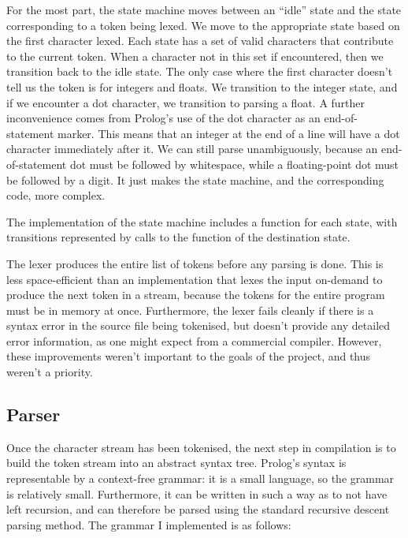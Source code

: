 \documentclass[12pt]{article}
\begin{document}
For the most part, the state machine moves between an ``idle'' state and the state corresponding to a token being lexed. 
We move to the appropriate state based on the first character lexed. 
Each state has a set of valid characters that contribute to the current token. 
When a character not in this set if encountered, then we transition back to the idle state.
The only case where the first character doesn't tell us the token is for integers and floats. 
We transition to the integer state, and if we encounter a dot character, we transition to parsing a float.
A further inconvenience comes from Prolog's use of the dot character as an end-of-statement marker. 
This means that an integer at the end of a line will have a dot character immediately after it. 
We can still parse unambiguously, because an end-of-statement dot must be followed by whitespace, while a floating-point dot must be followed by a digit. 
It just makes the state machine, and the corresponding code, more complex.

The implementation of the state machine includes a function for each state, with transitions represented by calls to the function of the destination state.

The lexer produces the entire list of tokens before any parsing is done. 
This is less space-efficient than an implementation that lexes the input on-demand to produce the next token in a stream, because the tokens for the entire program must be in memory at once. 
Furthermore, the lexer fails cleanly if there is a syntax error in the source file being tokenised, but doesn't provide any detailed error information, as one might expect from a commercial compiler. 
However, these improvements weren't important to the goals of the project, and thus weren't a priority.

\subsection{Parser}

Once the character stream has been tokenised, the next step in compilation is to build the token stream into an abstract syntax tree. 
Prolog's syntax is representable by a context-free grammar: it is a small language, so the grammar is relatively small. 
Furthermore, it can be written in such a way as to not have left recursion, and can therefore be parsed using the standard recursive descent parsing method. 
The grammar I implemented is as follows:

\newpage
\end{document}
